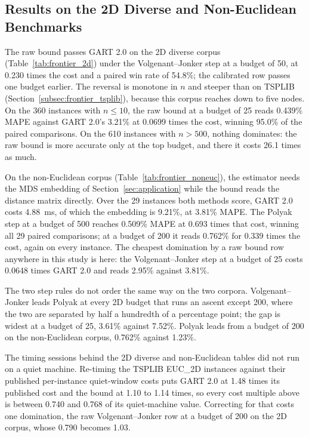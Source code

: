 \documentclass{article}
\begin{document}
\subsection{Results on the 2D Diverse and Non-Euclidean Benchmarks} \label{subsec:frontier_other}

The raw bound passes GART 2.0 on the 2D diverse corpus (Table~\ref{tab:frontier_2d}) under the Volgenant--Jonker step at a budget of 50, at 0.230 times the cost and a paired win rate of 54.8\%; the calibrated row passes one budget earlier. The reversal is monotone in $n$ and steeper than on TSPLIB (Section~\ref{subsec:frontier_tsplib}), because this corpus reaches down to five nodes. On the 360 instances with $n\le10$, the raw bound at a budget of 25 reads 0.439\% MAPE against GART 2.0's 3.21\% at 0.0699 times the cost, winning 95.0\% of the paired comparisons. On the 610 instances with $n>500$, nothing dominates: the raw bound is more accurate only at the top budget, and there it costs 26.1 times as much.

On the non-Euclidean corpus (Table~\ref{tab:frontier_noneuc}), the estimator needs the MDS embedding of Section~\ref{sec:application} while the bound reads the distance matrix directly. Over the 29 instances both methods score, GART 2.0 costs 4.88~ms, of which the embedding is 9.21\%, at 3.81\% MAPE. The Polyak step at a budget of 500 reaches 0.509\% MAPE at 0.693 times that cost, winning all 29 paired comparisons; at a budget of 200 it reads 0.762\% for 0.339 times the cost, again on every instance. The cheapest domination by a raw bound row anywhere in this study is here: the Volgenant--Jonker step at a budget of 25 costs 0.0648 times GART 2.0 and reads 2.95\% against 3.81\%.

The two step rules do not order the same way on the two corpora. Volgenant--Jonker leads Polyak at every 2D budget that runs an ascent except 200, where the two are separated by half a hundredth of a percentage point; the gap is widest at a budget of 25, 3.61\% against 7.52\%. Polyak leads from a budget of 200 on the non-Euclidean corpus, 0.762\% against 1.23\%.

The timing sessions behind the 2D diverse and non-Euclidean tables did not run on a quiet machine. Re-timing the TSPLIB EUC\_2D instances against their published per-instance quiet-window costs puts GART 2.0 at 1.48 times its published cost and the bound at 1.10 to 1.14 times, so every cost multiple above is between 0.740 and 0.768 of its quiet-machine value. Correcting for that costs one domination, the raw Volgenant--Jonker row at a budget of 200 on the 2D corpus, whose 0.790 becomes 1.03.
\end{document}
